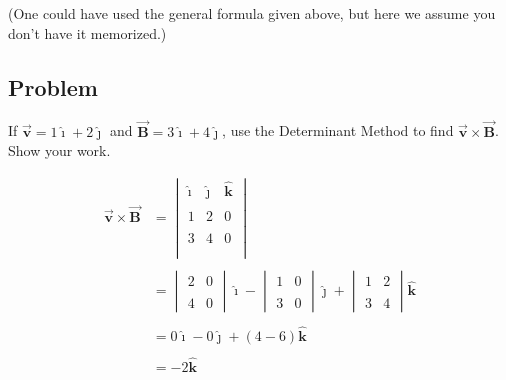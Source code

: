 \documentclass{article}
\newcommand{\ihat}[0]{\hat{\boldsymbol{\imath}}}
\newcommand{\jhat}[0]{\hat{\boldsymbol{\jmath}}}
\newcommand{\khat}[0]{\hat{\boldsymbol{k}}}
\newcommand{\bfvec}[1]{\vec{\mathbf{#1}}}
\begin{document}
(One could have used the general formula given above, but here we assume you don't have it memorized.)

\subsection{Problem}

If $\bfvec{v}=1\ihat+2\jhat$ and $\bfvec{B}=3\ihat+4\jhat$, use the Determinant Method to find $\bfvec{v}\times\bfvec{B}$. Show your work.

\ifsolutions
$$
\begin{align*}
\bfvec{v}\times\bfvec{B}
&=
\begin{vmatrix}
\ihat&\jhat&\khat\\\\
1&2&0\\\\
3&4&0\\\\
\end{vmatrix}
\\\\ &=
\begin{vmatrix}
2 & 0 \\\\
4 & 0 
\end{vmatrix} \ihat - \begin{vmatrix}
1 & 0 \\\\
3 & 0 
\end{vmatrix} \jhat +  \begin{vmatrix}
1 & 2 \\\\
3 & 4 
\end{vmatrix} \khat
\\\\ &=
0\ihat - 0\jhat + (4-6)\khat
\\\\ &=
-2\khat
\end{align*}
$$
\fi
\end{document}
